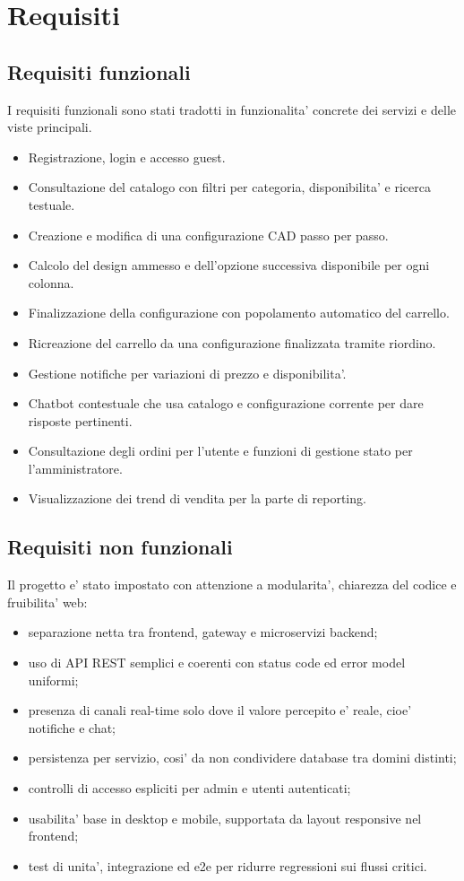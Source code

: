 \chapter{Requisiti}

\section{Requisiti funzionali}

I requisiti funzionali sono stati tradotti in funzionalita' concrete dei servizi e delle viste principali.

\begin{itemize}
\item Registrazione, login e accesso guest.
\item Consultazione del catalogo con filtri per categoria, disponibilita' e ricerca testuale.
\item Creazione e modifica di una configurazione CAD passo per passo.
\item Calcolo del design ammesso e dell'opzione successiva disponibile per ogni colonna.
\item Finalizzazione della configurazione con popolamento automatico del carrello.
\item Ricreazione del carrello da una configurazione finalizzata tramite riordino.
\item Gestione notifiche per variazioni di prezzo e disponibilita'.
\item Chatbot contestuale che usa catalogo e configurazione corrente per dare risposte pertinenti.
\item Consultazione degli ordini per l'utente e funzioni di gestione stato per l'amministratore.
\item Visualizzazione dei trend di vendita per la parte di reporting.
\end{itemize}

\section{Requisiti non funzionali}

Il progetto e' stato impostato con attenzione a modularita', chiarezza del codice e fruibilita' web:

\begin{itemize}
\item separazione netta tra frontend, gateway e microservizi backend;
\item uso di API REST semplici e coerenti con status code ed error model uniformi;
\item presenza di canali real-time solo dove il valore percepito e' reale, cioe' notifiche e chat;
\item persistenza per servizio, cosi' da non condividere database tra domini distinti;
\item controlli di accesso espliciti per admin e utenti autenticati;
\item usabilita' base in desktop e mobile, supportata da layout responsive nel frontend;
\item test di unita', integrazione ed e2e per ridurre regressioni sui flussi critici.
\end{itemize}

